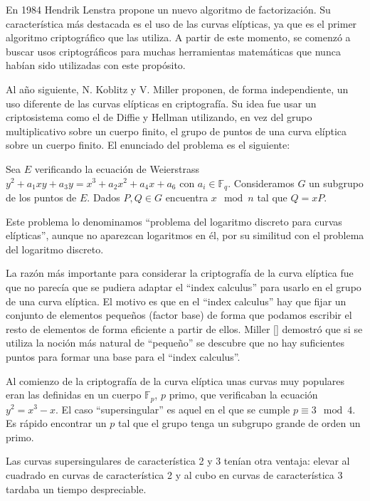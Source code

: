\documentclass[
  a4paper,
  12pt,
  spanish,
]{scrartcl}
\begin{document}
En 1984 Hendrik Lenstra propone un nuevo algoritmo de factorización. Su característica más destacada es el uso de las curvas elípticas, ya que es el primer algoritmo criptográfico que las utiliza. A partir de este momento, se comenzó a buscar usos criptográficos para muchas herramientas matemáticas que nunca habían sido utilizadas con este propósito.


Al año siguiente, N. Koblitz y V. Miller proponen, de forma independiente, un uso diferente de las curvas elípticas en criptografía. Su idea fue usar un criptosistema como el de Diffie y Hellman utilizando, en vez del grupo multiplicativo sobre un cuerpo finito, el grupo de puntos de una curva elíptica sobre un cuerpo finito. El enunciado del problema es el siguiente:
\begin{displayquote}
  Sea $E$ verificando la ecuación de Weierstrass $y^2+a_1xy+a_3y=x^3+a_2x^2+a_4x+a_6$ con $a_i \in \mathbb{F}_q$. Consideramos $G$ un subgrupo de los puntos de $E$. Dados $P,Q \in G$ encuentra $x \mod{n}$ tal que $Q=xP$. 
\end{displayquote} 
Este problema lo denominamos ``problema del logaritmo discreto para curvas elípticas'', aunque no aparezcan logaritmos en él, por su similitud con el problema del logaritmo discreto.

La razón más importante para considerar la criptografía de la curva elíptica fue que no parecía que se pudiera adaptar el ``index calculus'' para usarlo en el grupo de una curva elíptica. El motivo es que en el ``index calculus'' hay que fijar un conjunto de elementos pequeños (factor base) de forma que podamos escribir el resto de elementos de forma eficiente a partir de ellos. Miller [] demostró que si se utiliza la noción más natural de ``pequeño'' se descubre que no hay suficientes puntos para formar una base para el ``index calculus''.

Al comienzo de la criptografía de la curva elíptica unas curvas muy populares eran las definidas en un cuerpo $\mathbb{F}_p$, $p$ primo, que verificaban la ecuación $y^2 = x^3 - x$. El caso ``supersingular'' es aquel en el que se cumple $p \equiv 3 \mod 4$.  Es rápido encontrar un $p$ tal que el grupo tenga un subgrupo grande de orden un primo.

Las curvas supersingulares de característica 2 y 3 tenían otra ventaja: elevar al cuadrado en curvas de característica 2 y al cubo en curvas de característica 3 tardaba un tiempo despreciable.
\end{document}
